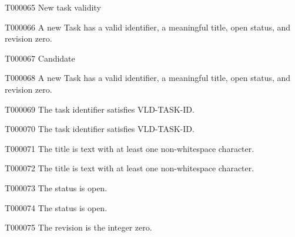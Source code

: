 \documentclass[11pt,a4paper]{article}
\begin{document}
\begin{atlastext}{T000065}
New task validity
\end{atlastext}
\begin{atlasparagraph}{T000066}
A new Task has a valid identifier, a meaningful title, open status, and revision zero.
\end{atlasparagraph}
\begin{atlastext}{T000067}
Candidate
\end{atlastext}
\begin{atlasparagraph}{T000068}
A new Task has a valid identifier, a meaningful title, open status, and revision zero.
\end{atlasparagraph}
\begin{atlastext}{T000069}
The task identifier satisfies VLD-TASK-ID.
\end{atlastext}
\begin{atlasparagraph}{T000070}
The task identifier satisfies VLD-TASK-ID.
\end{atlasparagraph}
\begin{atlastext}{T000071}
The title is text with at least one non-whitespace character.
\end{atlastext}
\begin{atlasparagraph}{T000072}
The title is text with at least one non-whitespace character.
\end{atlasparagraph}
\begin{atlastext}{T000073}
The status is open.
\end{atlastext}
\begin{atlasparagraph}{T000074}
The status is open.
\end{atlasparagraph}
\begin{atlastext}{T000075}
The revision is the integer zero.
\end{atlastext}
\end{document}
